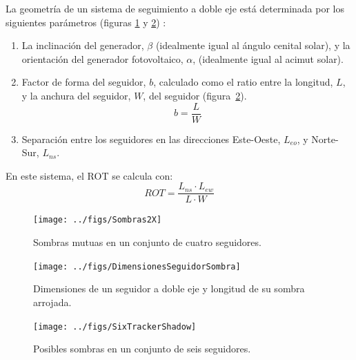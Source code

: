 La geometría de un sistema de seguimiento a doble eje está determinada
por los siguientes parámetros (figuras \ref{fig:Sombras2X} y \ref{fig:DimensionesSeguidorSombra})
: 
\begin{enumerate}
\item La inclinación del generador, $\beta$ (idealmente igual al ángulo
cenital solar), y la orientación del generador fotovoltaico, $\alpha$,
(idealmente igual al acimut solar).
\item Factor de forma del seguidor, $b$,
calculado como el ratio entre la longitud, $L$, y la anchura del
seguidor, $W$,
del seguidor (figura~\ref{fig:DimensionesSeguidorSombra}).
\begin{equation}
b=\frac{L}{W}
\end{equation}

\item Separación entre los seguidores en las direcciones Este-Oeste, 
$L_{eo}$,
y Norte-Sur, $L_{ns}$. 
\end{enumerate}
%
En este sistema, el ROT se calcula con:
\begin{equation}
  \label{eq:ROT2x}
  ROT=\frac{L_{ns} \cdot L_{ew}}{L \cdot W}
\end{equation}

\begin{figure}
\begin{centering}
\texttt{[image: ../figs/Sombras2X]}
\end{centering}

\caption{\label{fig:Sombras2X}Sombras mutuas en un conjunto de cuatro seguidores.}

\end{figure}

%
\begin{figure}
\begin{centering}
\texttt{[image: ../figs/DimensionesSeguidorSombra]}
\end{centering}

\caption{\label{fig:DimensionesSeguidorSombra}Dimensiones de un seguidor a
doble eje y longitud de su sombra arrojada.}

\end{figure}


%
\begin{figure}
\begin{centering}
\texttt{[image: ../figs/SixTrackerShadow]}
\end{centering}

\caption{\label{fig:SeisSeguidores}Posibles sombras en un conjunto de seis
seguidores.}

\end{figure}


